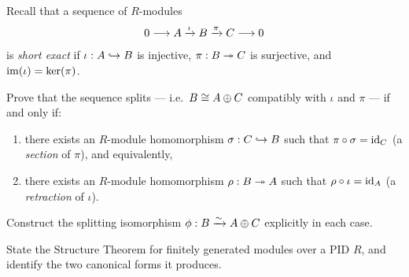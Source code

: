 \documentclass[10pt]{article}
\begin{document}


\begin{problem}
Recall that a sequence of $R$-modules
\[
    0 \longrightarrow A \xrightarrow{\iota} B \xrightarrow{\pi} C \longrightarrow 0
\]
is \emph{short exact} if $\iota : A \hookrightarrow B$ is injective, $\pi : B \twoheadrightarrow C$ is surjective,
and $\operatorname{im}(\iota) = \ker(\pi)$.

\begin{parts}
    \item Prove that the sequence splits --- i.e.\ $B \cong A \oplus C$ compatibly
    with $\iota$ and $\pi$ --- if and only if:
    \begin{enumerate}
        \item[(i)] there exists an $R$-module homomorphism $\sigma : C \hookrightarrow B$
              such that $\pi \circ \sigma = \mathrm{id}_C$ (a \emph{section} of $\pi$), and equivalently,
        \item[(ii)] there exists an $R$-module homomorphism $\rho : B \twoheadrightarrow A$
              such that $\rho \circ \iota = \mathrm{id}_A$ (a \emph{retraction} of $\iota$).
    \end{enumerate}
    Construct the splitting isomorphism $\phi : B \xrightarrow{\sim} A \oplus C$ explicitly in each case.

    \item State the Structure Theorem for finitely generated modules over a PID $R$,
    and identify the two canonical forms it produces.
\end{parts}
\end{problem}
\end{document}
